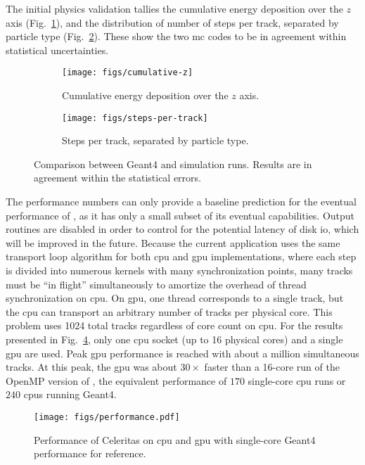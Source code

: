 The initial physics validation tallies the cumulative energy deposition over the
$z$ axis (Fig.~\ref{fig:physics-results:edep}), and the distribution of number
of steps per track, separated by particle type
(Fig.~\ref{fig:physics-results:steps}). These show the two \ac{mc} codes to be
in agreement within statistical uncertainties.
\begin{figure}
  \centering%
  \begin{subfigure}{\textwidth/2}%
    \texttt{[image: figs/cumulative-z]}%
    \caption{Cumulative energy deposition over the $z$ axis.}%
    \label{fig:physics-results:edep}
  \end{subfigure}%
  \begin{subfigure}{\textwidth/2}%
    \texttt{[image: figs/steps-per-track]}%
    \caption{Steps per track, separated by particle type.}%
    \label{fig:physics-results:steps}
  \end{subfigure}
  \caption{Comparison between Geant4 and \celeritas simulation runs. Results are
  in agreement within the statistical errors.}
  \label{fig:physics-results}
\end{figure}
The performance numbers can only provide a baseline prediction for the eventual
performance of \celeritas, as it has only a small subset of its eventual
capabilities. Output routines are disabled in order to control for the potential
latency of disk \ac{io}, which will be improved in the future. Because the
current \celeritas application uses the same transport loop algorithm for both
\ac{cpu} and \ac{gpu} implementations, where each step is divided into numerous
kernels with many synchronization points, many tracks must be ``in flight''
simultaneously to amortize the overhead of thread synchronization on \ac{cpu}.
On \ac{gpu}, one thread corresponds to a single track, but the \ac{cpu} can
transport an arbitrary number of tracks per physical core. This problem uses
\num{1024} total tracks regardless of core count on \ac{cpu}. For the results
presented in Fig.~\ref{fig:celeritas-performance}, only one \ac{cpu} socket (up
to 16 physical cores) and a single \ac{gpu} are used. Peak \ac{gpu} performance
is reached with about a million simultaneous tracks. At this peak, the \ac{gpu}
was about $30 \times$ faster than a 16-core run of the OpenMP version of
\celeritas, the equivalent performance of $170$ single-core \ac{cpu} \celeritas
runs or $240$ \acp{cpu} running Geant4.

\begin{figure}
    \centering
    \texttt{[image: figs/performance.pdf]}
    \caption{Performance of Celeritas on \acs{cpu} and \acs{gpu} with
  single-core Geant4 performance for reference.}
    \label{fig:celeritas-performance}
\end{figure}

